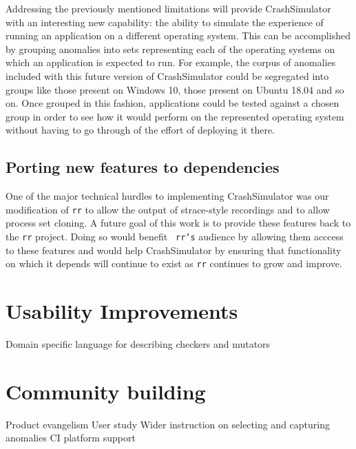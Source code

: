 \documentclass{article}
\begin{document}
Addressing the previously mentioned limitations will provide CrashSimulator
with an interesting new capability: the ability to simulate the experience
of running an application on a different operating system.  This can be
accomplished by grouping anomalies into sets representing each of the
operating systems on which an application is expected to run. For example,
the corpus of anomalies included with this future version of CrashSimulator
could be segregated into groups like those present on Windows 10, those
present on Ubuntu 18.04 and so on.  Once grouped in this fashion,
applications could be tested against a chosen group in order to see how it
would perform on the represented operating system without having to go
through of the effort of deploying it there.


\subsection{Porting new features to dependencies}

One of the major technical hurdles to implementing CrashSimulator was our
modification of {\tt rr} to allow the output of strace-style recordings and
to allow process set cloning.  A future goal of this work is to provide
these features back to the {\tt rr} project.  Doing so would benefit {\tt
rr's} audience by allowing them acccess to these features
and would help CrashSimulator by ensuring that functionality on which it
depends will continue to exist as {\tt rr} continues to grow and improve.


\section{Usability Improvements}
  Domain specific language for describing checkers and mutators


\section{Community building}
  Product evangelism
  User study
  Wider instruction on selecting and capturing anomalies
  CI platform support
\end{document}
